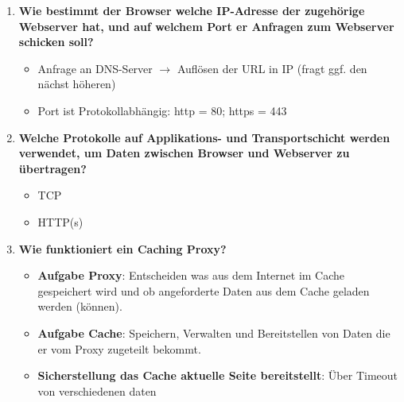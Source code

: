 \documentclass{article}
\begin{document}
\begin{enumerate}
\begin{itemize}
\begin{itemize}
		\end{itemize}
	\end{itemize}
	\item \textbf{Wie bestimmt der Browser welche IP-Adresse der zugehörige Webserver hat, und auf welchem Port er Anfragen zum Webserver schicken soll?}
	\begin{itemize}
		\item Anfrage an DNS-Server $ \longrightarrow $ Auflösen der URL in IP (fragt ggf. den nächst höheren)
		\item Port ist Protokollabhängig: http = 80; https = 443
	\end{itemize}
	\item \textbf{Welche Protokolle auf Applikations- und Transportschicht werden verwendet, um Daten zwischen Browser und Webserver zu übertragen?}
	\begin{itemize}
		\item TCP
		\item HTTP(s)
	\end{itemize}
	\item \textbf{Wie funktioniert ein Caching Proxy?}
	\begin{itemize}
		\item \textbf{Aufgabe Proxy}: Entscheiden was aus dem Internet im Cache gespeichert wird und ob angeforderte Daten aus dem Cache geladen werden (können).
		\item \textbf{Aufgabe Cache}: Speichern, Verwalten und Bereitstellen von Daten die er vom Proxy zugeteilt bekommt.
		\item \textbf{Sicherstellung das Cache aktuelle Seite bereitstellt}: Über Timeout von verschiedenen daten
	\end{itemize}


\end{enumerate}
\end{document}
